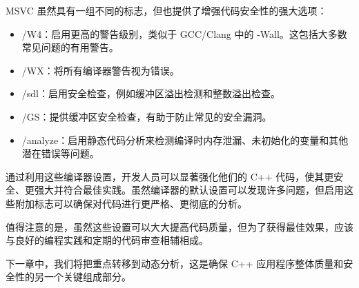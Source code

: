 
MSVC 虽然具有一组不同的标志，但也提供了增强代码安全性的强大选项：

\begin{itemize}
\item
/W4：启用更高的警告级别，类似于 GCC/Clang 中的 -Wall。这包括大多数常见问题的有用警告。

\item
/WX：将所有编译器警告视为错误。

\item
/sdl：启用安全检查，例如缓冲区溢出检测和整数溢出检查。

\item
/GS：提供缓冲区安全检查，有助于防止常见的安全漏洞。

\item
/analyze：启用静态代码分析来检测编译时内存泄漏、未初始化的变量和其他潜在错误等问题。
\end{itemize}

通过利用这些编译器设置，开发人员可以显著强化他们的 C++ 代码，使其更安全、更强大并符合最佳实践。虽然编译器的默认设置可以发现许多问题，但启用这些附加标志可以确保对代码进行更严格、更彻底的分析。

值得注意的是，虽然这些设置可以大大提高代码质量，但为了获得最佳效果，应该与良好的编程实践和定期的代码审查相辅相成。

下一章中，我们将把重点转移到动态分析，这是确保 C++ 应用程序整体质量和安全性的另一个关键组成部分。








